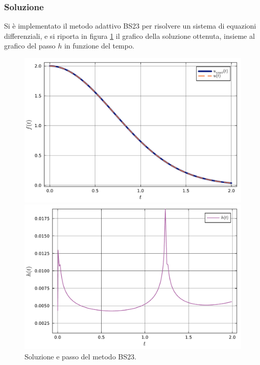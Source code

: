\documentclass[letterpaper, 12pt]{article}
\numberwithin{equation}{section}    %
\begin{document}
\subsubsection{Soluzione}
Si è implementato il metodo adattivo BS23 per risolvere un sistema di equazioni differenziali, e si riporta in 
figura \ref{fig:es6_3_5_1} il grafico della soluzione ottenuta, insieme al grafico del passo $h$ in funzione del
tempo. \\
\begin{figure}[!ht]
    \centering
    \begin{minipage}[b]{0.47\textwidth}
        \includegraphics[width=\textwidth]{6351.pdf}
    \end{minipage}
    \hspace{0.5cm}
    \begin{minipage}[b]{0.47\textwidth}
        \includegraphics[width=\textwidth]{6352.pdf}
    \end{minipage}
    \caption{Soluzione e passo del metodo BS23.}
    \label{fig:es6_3_5_1}
\end{figure}
\end{document}
